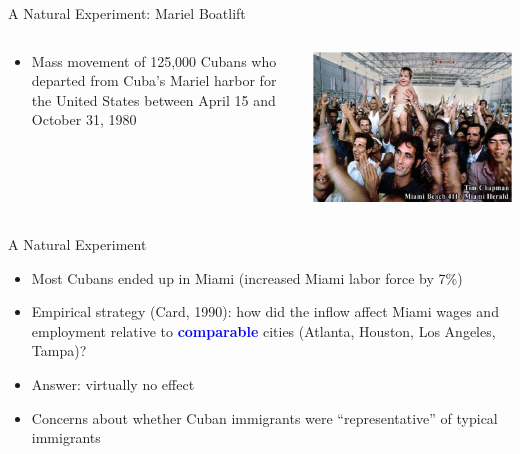 \documentclass[10pt,hyperref={CJKbookmarks=true},xcolor=dvipsnames,aspectratio=169]{beamer}
\begin{document}
\begin{frame}{A Natural Experiment: Mariel Boatlift}


\begin{columns}[onlytextwidth]
\begin{column}{0.3\textwidth}
\begin{itemize}
\item Mass movement of 125,000 Cubans who departed from Cuba’s Mariel harbor
for the United States between April 15 and October 31, 1980
\end{itemize}

\end{column}
\begin{column}{0.7\textwidth}
\includegraphics[width=0.9\columnwidth]{fig/migration/lec4-35}
\end{column}
\end{columns}

\end{frame}

\begin{frame}{A Natural Experiment }

\begin{itemize}
\item Most Cubans ended up in Miami (increased Miami labor force by 7\%) 
\item Empirical strategy (Card, 1990): how did the inflow affect Miami wages
and employment relative to \textbf{\textcolor{blue}{comparable}} cities
(Atlanta, Houston, Los Angeles, Tampa)? 
\item Answer: virtually no effect 
\item Concerns about whether Cuban immigrants were “representative” of typical
immigrants
\end{itemize}
\end{frame}
\end{document}
